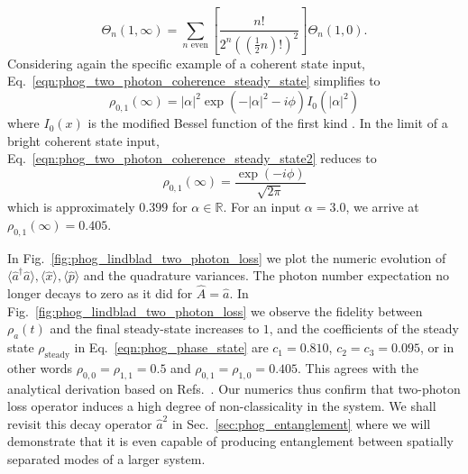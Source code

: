 \begin{equation}\label{eqn:phog_two_photon_coherence_steady_state}
\Theta_n\left(1, \infty\right) = \sum_{n \text{ even}}  \left[\frac{n!}{2^n \left(\left(\frac{1}{2}n\right)!\right)^2} \right] \Theta_n\left(1, 0\right).
\end{equation}
Considering again the specific example of a coherent state input, Eq.~\ref{eqn:phog_two_photon_coherence_steady_state} simplifies to
\begin{equation}\label{eqn:phog_two_photon_coherence_steady_state2}
\rho_{0, 1}\left(\infty\right) = \left|\alpha\right|^2 \exp\left(- \left|\alpha\right|^2 - i \phi\right) I_0\left(\left|\alpha\right|^2\right)
\end{equation}
where $I_0\left(x\right)$ is the modified Bessel function of the first kind \cite{mathworld_bessel}. In the limit of a bright coherent state input, Eq.~\ref{eqn:phog_two_photon_coherence_steady_state2} reduces to \cite{Simaan1978, Ezaki2000}
\begin{equation}
\rho_{0, 1}\left(\infty\right) = \frac{\exp\left(- i \phi\right)}{\sqrt{2 \pi}} 
\end{equation}
which is approximately $0.399$ for $\alpha \in \mathbb{R}$. For an input $\alpha = 3.0$, we arrive at $\rho_{0, 1}\left(\infty\right) = 0.405$.





In Fig.~\ref{fig:phog_lindblad_two_photon_loss} we plot the numeric evolution of $\langle \hat{a}^\dagger \hat{a}\rangle, \langle \hat{x}\rangle, \langle \hat{p}\rangle$ and the quadrature variances. The photon number expectation no longer decays to zero as it did for $\hat{A}=\hat{a}$. %
 In Fig.~\ref{fig:phog_lindblad_two_photon_loss} we observe the fidelity between $\rho_a\left(t\right)$ and the final steady-state increases to $1$, and the coefficients of the steady state $\rho_{\text{steady}}$ in Eq.~\ref{eqn:phog_phase_state} are $c_1 = 0.810$, $c_2 = c_3 = 0.095$, or in other words $\rho_{0,0} = \rho_{1,1} = 0.5$ and $\rho_{0,1} = \rho_{1,0} = 0.405$. This agrees with the analytical derivation based on Refs.~\cite{Simaan1975, Simaan1978, Ezaki1999, Ezaki2000}. Our numerics thus confirm that two-photon loss operator induces a high degree of non-classicality in the system. We shall revisit this decay operator $\hat{a}^2$ in Sec.~\ref{sec:phog_entanglement} where we will demonstrate that it is even capable of producing entanglement between spatially separated modes of a larger system.


